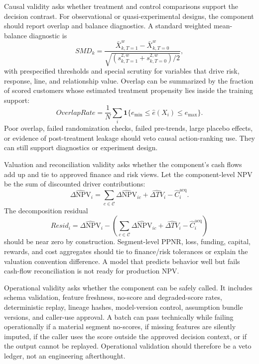 \documentclass[11pt]{article}
\newcommand{\NPV}{\mathrm{NPV}}
\newcommand{\1}{\mathbf{1}}
\begin{document}
Causal validity asks whether treatment and control comparisons support the
decision contrast. For observational or quasi-experimental designs, the
component should report overlap and balance diagnostics. A standard weighted
mean-balance diagnostic is
\begin{equation}
  SMD_k
  =
  \frac{
    \bar X_{k,T=1}^{w}-\bar X_{k,T=0}^{w}
  }{
    \sqrt{(s_{k,T=1}^{2,w}+s_{k,T=0}^{2,w})/2}
  },
  \label{eq:smd}
\end{equation}
with prespecified thresholds and special scrutiny for variables that drive
risk, response, line, and relationship value. Overlap can be summarized by the
fraction of scored customers whose estimated treatment propensity lies inside
the training support:
\begin{equation}
  OverlapRate
  =
  \frac{1}{N}\sum_i
  \1\{e_{\min}\le \hat e(X_i)\le e_{\max}\}.
  \label{eq:overlap-rate}
\end{equation}
Poor overlap, failed randomization checks, failed pre-trends, large placebo
effects, or evidence of post-treatment leakage should veto causal
action-ranking use. They can still support diagnostics or experiment design.

Valuation and reconciliation validity asks whether the component's cash flows
add up and tie to approved finance and risk views. Let the component-level
NPV be the sum of discounted driver contributions:
\begin{equation}
  \widehat{\Delta \NPV}_i
  =
  \sum_{c\in\mathcal{C}}
  \widehat{\Delta \NPV}_{ic}
  + \widehat{\Delta TV}_i
  - \widehat C_i^{\mathrm{acq}}.
  \label{eq:decomposition-additivity}
\end{equation}
The decomposition residual
\[
  Resid_i
  =
  \widehat{\Delta \NPV}_i
  -
  \left(
  \sum_{c\in\mathcal{C}}\widehat{\Delta \NPV}_{ic}
  +\widehat{\Delta TV}_i-\widehat C_i^{\mathrm{acq}}
  \right)
\]
should be near zero by construction. Segment-level PPNR, loss, funding,
capital, rewards, and cost aggregates should tie to finance/risk tolerances or
explain the valuation convention difference. A model that predicts behavior
well but fails cash-flow reconciliation is not ready for production NPV.

Operational validity asks whether the component can be safely called. It
includes schema validation, feature freshness, no-score and degraded-score
rates, deterministic replay, lineage hashes, model-version control, assumption
bundle versions, and caller-use approval. A batch can pass technically while
failing operationally if a material segment no-scores, if missing features are
silently imputed, if the caller uses the score outside the approved decision
context, or if the output cannot be replayed. Operational validation should
therefore be a veto ledger, not an engineering afterthought.
\end{document}
